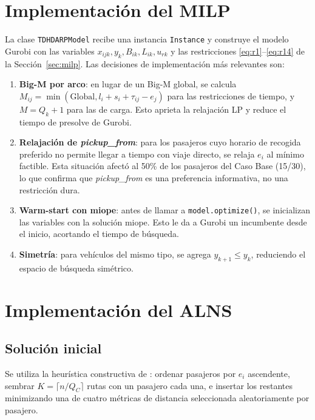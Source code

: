 \section{Implementación del MILP}

La clase \texttt{TDHDARPModel} recibe una instancia \texttt{Instance} y construye el modelo Gurobi con las variables $x_{ijk}, y_k, B_{ik}, L_{ik}, u_{rk}$ y las restricciones \eqref{eq:r1}–\eqref{eq:r14} de la Sección~\ref{sec:milp}. Las decisiones de implementación más relevantes son:

\begin{enumerate}
    \item \textbf{Big-M por arco}: en lugar de un Big-M global, se calcula $M_{ij} = \min(\text{Global}, l_i + s_i + \tau_{ij} - e_j)$ para las restricciones de tiempo, y $M = Q_k + 1$ para las de carga. Esto aprieta la relajación LP y reduce el tiempo de presolve de Gurobi.
    \item \textbf{Relajación de \textit{pickup\_from}}: para los pasajeros cuyo horario de recogida preferido no permite llegar a tiempo con viaje directo, se relaja $e_i$ al mínimo factible. Esta situación afectó al 50\% de los pasajeros del Caso Base (15/30), lo que confirma que \textit{pickup\_from} es una preferencia informativa, no una restricción dura.
    \item \textbf{Warm-start con miope}: antes de llamar a \texttt{model.optimize()}, se inicializan las variables con la solución miope. Esto le da a Gurobi un incumbente desde el inicio, acortando el tiempo de búsqueda.
    \item \textbf{Simetría}: para vehículos del mismo tipo, se agrega $y_{k+1} \leq y_k$, reduciendo el espacio de búsqueda simétrico.
\end{enumerate}

\section{Implementación del ALNS}

\subsection{Solución inicial}
Se utiliza la heurística constructiva de \cite{Pilati2025}: ordenar pasajeros por $e_i$ ascendente, sembrar $K = \lceil n / Q_C \rceil$ rutas con un pasajero cada una, e insertar los restantes minimizando una de cuatro métricas de distancia seleccionada aleatoriamente por pasajero.

